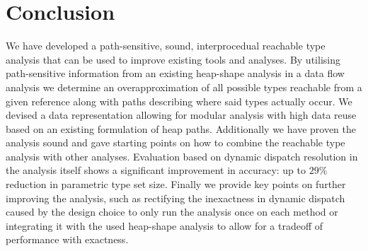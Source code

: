 \chapter{Conclusion}
\label{chap:conclusion}
We have developed a path-sensitive, sound, interprocedual reachable type analysis that can be used to improve existing tools and analyses. 
By utilising path-sensitive information from an existing heap-shape analysis in a data flow analysis we determine an overapproximation of all possible types reachable from a given reference along with paths describing where said types actually occur. We devised a data representation allowing for modular analysis with high data reuse based on an existing formulation of heap paths. Additionally we have proven the analysis sound and gave starting points on how to  combine the reachable type analysis with other analyses. Evaluation based on dynamic dispatch resolution in the analysis itself shows a significant improvement in accuracy: up to $29\%$ reduction in parametric type set size. Finally we provide key points on further improving the analysis, such as rectifying the inexactness in dynamic dispatch caused by the design choice to only run the analysis once on each method or integrating it with the used heap-shape analysis to allow for a tradeoff of performance with exactness.